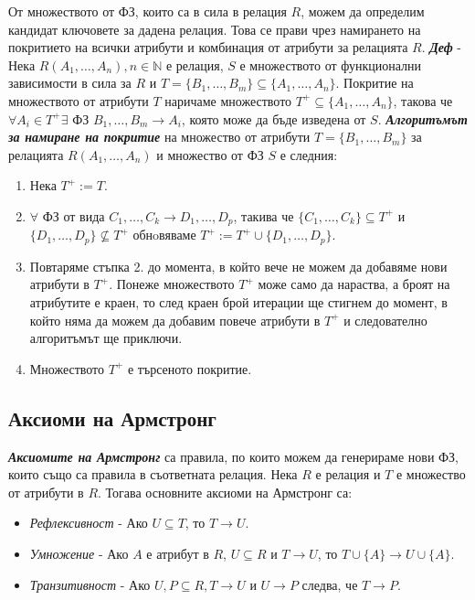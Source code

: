 \documentclass[fleqn,12pt]{article}
\begin{document}
От множеството от ФЗ, които са в сила в релация $R$, можем да определим кандидат ключовете за дадена релация.
Това се прави чрез намирането на покритието на всички атрибути и комбинация от атрибути за релацията $R$.
\bigbreak
\textbf{\textit{Деф}} - Нека $R(A_1, \dots, A_n), n \in \mathbb{N}$ е релация, $S$ е множеството от функционални зависимости в сила за $R$ и $T = \{B_1, \dots, B_m\} \subseteq \{A_1, \dots, A_n\}$.
Покритие на множеството от атрибути $T$ наричаме множеството $T^{+} \subseteq \{A_1, \dots, A_n\}$, такова че $\forall A_i \in T^{+} \exists$ ФЗ $B_1, \dots, B_m \rightarrow A_i$, която може да бъде изведена от $S$.
\bigbreak
\textbf{\textit{Алгоритъмът за намиране на покритие}} на множество от атрибути $T = \{B_1, \dots, B_m\}$ за релацията $R(A_1, \dots, A_n)$ и множество от ФЗ $S$ е следния:
\begin{enumerate}
    \item Нека $T^{+} := T$.
    \item $\forall$ ФЗ от вида $C_1, \dots, C_k \rightarrow D_1, \dots, D_p$, такива че $\{C_1, \dots, C_k\} \subseteq T^{+}$ и $\{D_1, \dots, D_p\} \nsubseteq T^{+}$ обнoвяваме $T^{+} := T^{+} \cup \{D_1, \dots, D_p\}$.
    \item Повтаряме стъпка 2. до момента, в който вече не можем да добавяме нови атрибути в $T^{+}$.
    Понеже множеството $T^{+}$ може само да нараства, а броят на атрибутите е краен, то след краен брой итерации ще стигнем до момент, в който няма да можем да добавим повече атрибути в $T^{+}$ и следователно алгоритъмът ще приключи.
    \item Множеството $T^{+}$ е търсеното покритие.
\end{enumerate}

\subsection{Аксиоми на Армстронг}

\textbf{\textit{Аксиомите на Армстронг}} са правила, по които можем да генерираме нови ФЗ, които също са правила в съответната релация.
Нека $R$ е релация и $T$ е множество от атрибути в $R$.
Тогава основните аксиоми на Армстронг са:
\begin{itemize}
    \item \textit{Рефлексивност} - Ако $U \subseteq T$, то $T \rightarrow U$.
    \item \textit{Умножение} - Ако $A$ е атрибут в $R$, $U \subseteq R$ и $T \rightarrow U$, то $T \cup \{A\} \rightarrow U \cup \{A\}$.
    \item \textit{Транзитивност} - Ако $U, P \subseteq R, T \rightarrow U$ и $U \rightarrow P$ следва, че $T \rightarrow P$.
\end{itemize}
\end{document}

